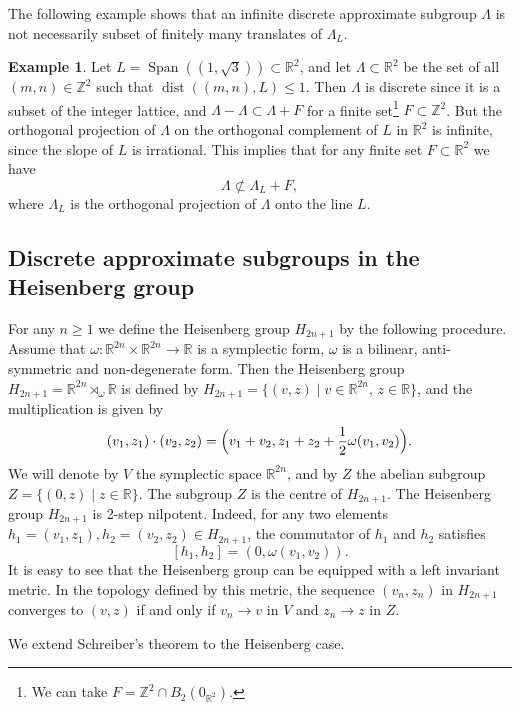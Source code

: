 \documentclass[JEP,XML,SOM,Unicode,NoEqCountersInSection]{cedram}
\DeclareMathOperator{\dist}{dist}
\DeclareMathOperator{\Span}{Span}
\newcommand{\bR}{\mathbb{R}}
\newcommand{\bZ}{\mathbb{Z}}
\newcounter{dummy} \numberwithin{dummy}{section}
\theoremstyle{plain}
\theoremstyle{definition}
\newtheorem{example}[dummy]{Example}
\begin{document}
The following example shows that an infinite discrete approximate subgroup $\Lambda$ is not necessarily subset of finitely many translates of $\Lambda_L$.

\begin{example}
Let $L = \Span((1,\sqrt{3})) \subset \bR^2$, and let $\Lambda \subset \bR^2$ be the set of all $(m,n) \in \bZ^2$ such that $\dist((m,n),L) \le 1$. Then $\Lambda$ is discrete since it is a subset of the integer lattice, and $\Lambda - \Lambda \subset \Lambda + F$ for a finite set\footnote{We can take $F = \bZ^2 \cap B_{2}(0_{\bR^2})$.} $F \subset \bZ^2$. But the orthogonal projection of $\Lambda$ on the orthogonal complement of $L$ in $\bR^2$ is infinite, since the slope of $L$ is irrational. This implies that for any finite set $F \subset \bR^2$ we have
\[
\Lambda \not \subset \Lambda_L + F,
\]
where $\Lambda_L$ is the orthogonal projection of $\Lambda$ onto the line $L$.
\end{example}

\subsection{Discrete approximate subgroups in the Heisenberg group} For any $n \ge 1$ we define the Heisenberg group $H_{2n+1}$ by the following procedure. Assume that \hbox{$\omega:\bR^{2n} \times \bR^{2n} \to \bR$} is a symplectic form, \ie $\omega$ is a bilinear, anti-symmetric and non-degenerate form. Then the Heisenberg group $H_{2n+1} = \bR^{2n} \rtimes_{\omega} \bR$ is defined by $H_{2n+1} = \{ (v,z) \mid v \in \bR^{2n},\, z \in \bR\}$, and the multiplication is given by
\[
(v_1,z_1) \cdot (v_2,z_2) = \Bigl(v_1+v_2, z_1 + z_2 + \frac{1}{2}\omega(v_1,v_2)\Bigr).
\]
We will denote by $V$ the symplectic space $\bR^{2n}$, and by $Z$ the abelian subgroup \hbox{$Z = \{ (0,z) \mid z \in \bR\}$}. The subgroup $Z$ is the centre of $H_{2n+1}$. The Heisenberg group $H_{2n+1}$ is 2-step nilpotent. Indeed, for any two elements $h_1= (v_1,z_1), h_2 = (v_2,z_2) \in H_{2n+1}$, the commutator of $h_1$ and $h_2$ satisfies
\begin{equation}
\label{import_id}
[h_1,h_2] = (0, \omega(v_1,v_2)).
\end{equation}
It is easy to see that the Heisenberg group can be equipped with a left invariant metric. In the topology defined by this metric, the sequence $(v_n,z_n)$ in $H_{2n+1}$ converges to $(v,z)$ if and only if $v_n \to v$ in $V$ and $z_n \to z$ in $Z$.

We extend Schreiber's theorem to the Heisenberg case.
\end{document}

